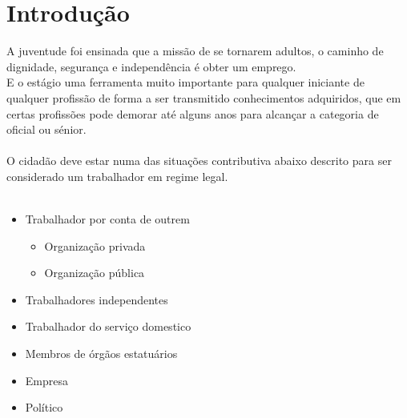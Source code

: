 \section{Introdução}
\qquad A juventude foi ensinada que a missão de se tornarem adultos, o caminho de dignidade, segurança e independência é obter um emprego. \cite{book_11} \\
E o estágio uma ferramenta muito importante para qualquer iniciante de qualquer profissão de forma a ser transmitido conhecimentos adquiridos, que em certas profissões pode demorar até alguns anos para alcançar a categoria de oficial ou sénior. \\
\\
O cidadão deve estar numa das situações contributiva abaixo descrito para ser considerado um trabalhador em regime legal. \\
\\
\begin{minipage}[t]{\linewidth}
\begin{itemize}
\setlength\itemsep{-0.3em}
\item Trabalhador por conta de outrem
\begin{itemize}
\item Organização privada
\item Organização pública
\end{itemize}
\item Trabalhadores independentes
\newpage
\item Trabalhador do serviço domestico
\item Membros de órgãos estatuários
\item Empresa
\item Político
\end{itemize}
\end{minipage}

